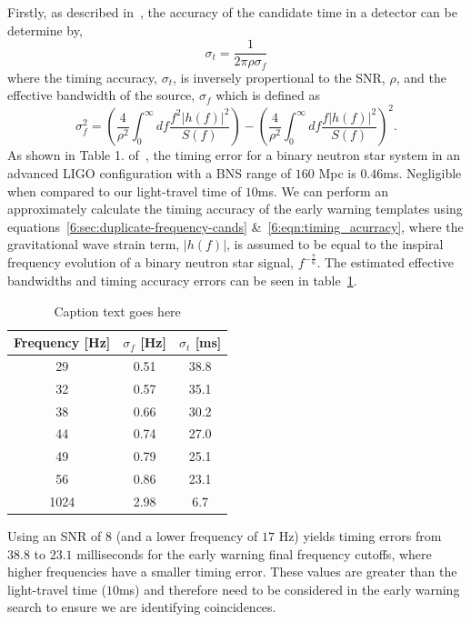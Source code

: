 Firstly, as described in~\cite{Fairhurst:2010}, the accuracy of the candidate time in a detector can be determine by,
%
\begin{equation}
    \sigma_{t} = \frac{1}{2\pi\rho\sigma_{f}}
    \label{6:eqn:timing_acurracy}
\end{equation}
%
where the timing accuracy, $\sigma_{t}$, is inversely propertional to the SNR, $\rho$, and the effective bandwidth of the source, $\sigma_{f}$ which is defined as
%
\begin{equation}
    \sigma_{f}^2 = \left(\frac{4}{\rho^{2}} \int^{\infty}_{0} df \frac{f^{2}|h(f)|^{2}}{S(f)}\right) - \left(\frac{4}{\rho^{2}} \int^{\infty}_{0} df \frac{f|h(f)|^{2}}{S(f)}\right)^{2} .
    \label{6:eqn:eff_bandiwdth}
\end{equation}
%
As shown in Table 1. of~\cite{Fairhurst:2010}, the timing error for a binary neutron star system in an advanced LIGO configuration with a BNS range of $160$ Mpc is $0.46$ms. Negligible when compared to our light-travel time of $10$ms. We can perform an approximately calculate the timing accuracy of the early warning templates using equations~\ref{6:sec:duplicate-frequency-cands} \&~\ref{6:eqn:timing_acurracy}, where the gravitational wave strain term, $|h(f)|$, is assumed to be equal to the inspiral frequency evolution of a binary neutron star signal, $f^{-\frac{7}{6}}$. The estimated effective bandwidths and timing accuracy errors can be seen in table~\ref{6:tab:timing_errors}.
%
\begin{table}[ht]
    \centering
    \setlength{\tabcolsep}{4pt}
    \begin{tabular}{ccc}
        \toprule
        \textbf{Frequency [Hz]} & $\sigma_{f}$ [Hz] & $\sigma_{t}$ [ms] \\
        \midrule
        29 & 0.51 & 38.8 \\
        32 & 0.57 & 35.1 \\
        38 & 0.66 & 30.2 \\
        44 & 0.74 & 27.0 \\
        49 & 0.79 & 25.1 \\
        56 & 0.86 & 23.1 \\
        1024 & 2.98 & 6.7 \\
        \bottomrule
    \end{tabular}
    \caption{Caption text goes here}
    \label{6:tab:timing_errors}
\end{table}
%
Using an SNR of $8$ (and a lower frequency of $17$ Hz) yields timing errors from $38.8$ to $23.1$ milliseconds for the early warning final frequency cutoffs, where higher frequencies have a smaller timing error. These values are greater than the light-travel time ($10$ms) and therefore need to be considered in the early warning search to ensure we are identifying coincidences.

